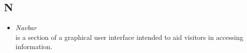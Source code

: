 \subsection*{N}
\begin{itemize}
    \item \textit{Navbar} \\ is a section of a graphical user interface intended to aid visitors in accessing information.
\end{itemize}